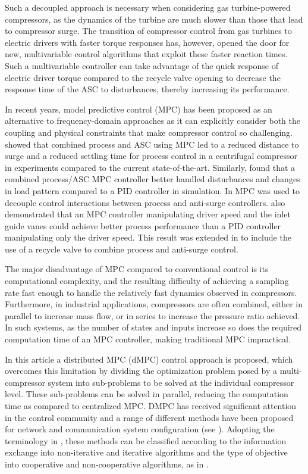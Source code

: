 Such a decoupled approach is necessary when considering gas turbine-powered compressors, as the dynamics of the turbine are much slower than those that lead to compressor surge.
The transition of compressor control from gas turbines to electric drivers with faster torque responses has, however, opened the door for new, multivariable control algorithms that exploit these faster reaction times.
Such a multivariable controller can take advantage of the quick response of electric driver torque compared to the recycle valve opening to decrease the response time of the ASC to disturbances, thereby increasing its performance.

In recent years, model predictive control (MPC) has been proposed as an alternative to frequency-domain approaches as it can explicitly consider both the coupling and physical constraints that make compressor control so challenging.
\cite{Cortinovis2015} showed that combined process and ASC using MPC led to a reduced distance to surge and a reduced settling time for process control in a centrifugal compressor in experiments compared to the current state-of-the-art.
Similarly, \cite{Budinis2015} found that a combined process/ASC MPC controller better handled disturbances and changes in load pattern compared to a PID controller in simulation.
In \cite{Mercangoz2016} MPC was used to decouple control interactions between process and anti-surge controllers.
\cite{Bentaleb2014} also demonstrated that an MPC controller manipulating driver speed and the inlet guide vanes could achieve better process performance than a PID controller manipulating only the driver speed.
This result was extended in \cite{Bentaleb2015} to include the use of a recycle valve to combine process and anti-surge control.

The major disadvantage of MPC compared to conventional control is its computational complexity, and the resulting difficulty of achieving a sampling rate fast enough to handle the relatively fast dynamics observed in compressors.
Furthermore, in industrial applications, compressors are often combined, either in parallel to increase mass flow, or in series to increase the pressure ratio achieved.
In such systems, as the number of states and inputs increase so does the required computation time of an MPC controller, making traditional MPC impractical.

In this article a distributed MPC (dMPC) control approach is proposed, which overcomes this limitation by dividing the optimization problem posed by a multi-compressor system into sub-problems to be solved at the individual compressor level.
These sub-problems can be solved in parallel, reducing the computation time as compared to centralized MPC.
DMPC has received significant attention in the control community and a range of different methods have been proposed for network and communication system configuration (see \cite{Camponogara2002, Venkat2007}).
Adopting the terminology in \cite{Scattolini2009}, these methods can be classified according to the information exchange into non-iterative and iterative algorithms and the type of objective into cooperative and non-cooperative algorithms, as in \cite{Zeilinger2013}.

